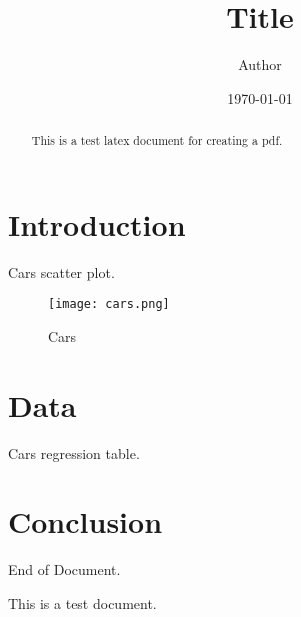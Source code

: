 \documentclass[12pt]{article}
\title{Title}
\author{Author}
\date{\today}
\begin{document}
\maketitle

\begin{abstract}
This is a test latex document for creating a pdf. 
\end{abstract}

\section{Introduction}
Cars scatter plot.

\begin{figure}[h]
\centering
\texttt{[image: cars.png]}
\caption{Cars}
\end{figure}

\section{Data}
Cars regression table.





\section{Conclusion}
End of Document.

\tiny{This is a test document.}
\end{document}
